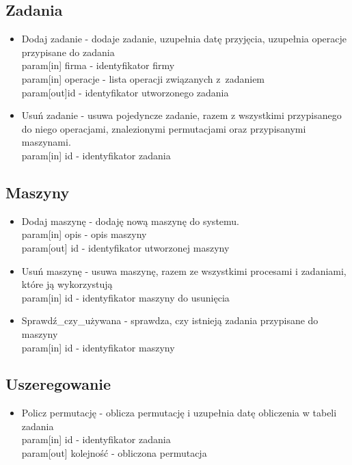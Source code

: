 \documentclass[a4paper]{article}
\begin{document}
\subsection{Zadania}
\begin{itemize}
    \item Dodaj zadanie - dodaje zadanie, uzupełnia datę przyjęcia, uzupełnia operacje przypisane do zadania \\
        param[in] firma - identyfikator firmy                       \\
        param[in] operacje - lista operacji związanych z~zadaniem   \\
        param[out]id - identyfikator utworzonego zadania            \\
    \item Usuń zadanie - usuwa pojedyncze zadanie, razem z wszystkimi przypisanego do niego operacjami, znalezionymi permutacjami oraz przypisanymi maszynami.             \\
        param[in] id - identyfikator zadania
\end{itemize}

\subsection{Maszyny}
\begin{itemize}
    \item Dodaj maszynę - dodaję nową maszynę do systemu.   \\
        param[in] opis - opis maszyny                       \\
        param[out] id - identyfikator utworzonej maszyny    \\
    \item Usuń maszynę - usuwa maszynę, razem ze wszystkimi procesami i zadaniami, które ją wykorzystują \\
        param[in] id - identyfikator maszyny do usunięcia   \\
    \item Sprawdź\_czy\_używana - sprawdza, czy istnieją zadania przypisane do maszyny \\
        param[in] id - identyfikator maszyny                \\
\end{itemize}

\subsection{Uszeregowanie}
\begin{itemize}
    \item Policz permutację - oblicza permutację i uzupełnia datę obliczenia w tabeli zadania \\
        param[in] id - identyfikator zadania \\
        param[out] kolejność - obliczona permutacja
\end{itemize}
\end{document}
